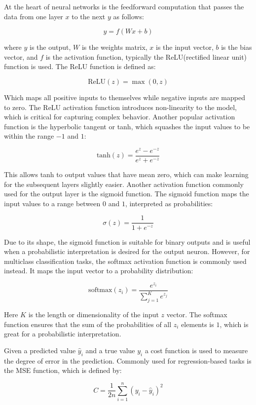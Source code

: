 \documentclass[11pt]{article}
\begin{document}
At the heart of neural networks is the feedforward computation that passes the data from one layer \(x\) to the next \(y\) as follows:

\[ y = f(Wx + b) \]

where \(y\) is the output, \(W\) is the weights matrix, \(x\) is the input vector, \(b\) is the bias vector, and \(f\) is the activation function, typically the ReLU(rectified linear unit) function is used. The ReLU function is defined as:

\[ \text{ReLU}(z) = \max(0, z) \]

Which maps all positive inputs to themselves while negative inputs are mapped to zero. The ReLU activation function introduces non-linearity to the model, which is critical for capturing complex behavior. Another popular activation function is the hyperbolic tangent or tanh, which squashes the input values to be within the range \(-1\) and \(1\):

\[
\text{tanh}(z) = \frac{e^{z} - e^{-z}}{e^{z} + e^{-z}}
\]

This allows tanh to output values that have mean zero, which can make learning for the subsequent layers slightly easier. Another activation function commonly used for the output layer is the sigmoid function. The sigmoid function maps the input values to a range between \(0\) and \(1\), interpreted as probabilities:

\[
\sigma(z) = \frac{1}{1 + e^{-z}}
\]

Due to its shape, the sigmoid function is suitable for binary outputs and is useful when a probabilistic interpretation is desired for the output neuron. However, for multiclass classification tasks, the softmax activation function is commonly used instead. It maps the input vector to a probability distribution:

\[
\text{softmax}(z_i) = \frac{e^{z_i}}{\sum_{j=1}^{K} e^{z_j}}
\]

Here $K$ is the length or dimensionality of the input $z$ vector. The softmax function ensures that the sum of the probabilities of all $z_i$ elements is \(1\), which is great for a probabilistic interpretation.

Given a predicted value \(\hat{y}_i\) and a true value \(y_i\) a cost function is used to measure the degree of error in the prediction. Commonly used for regression-based tasks is the MSE function, which is defined by:

\[ C = \frac{1}{2n} \sum_{i=1}^{n} (y_i - \hat{y}_i)^2 \]
\end{document}
